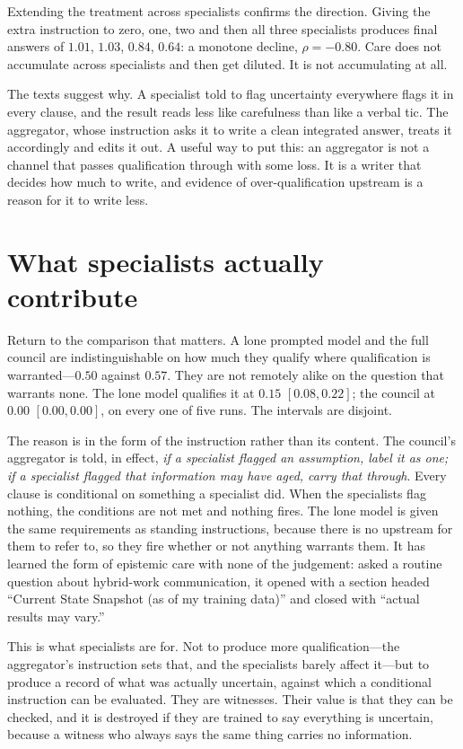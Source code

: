 \documentclass[11pt]{article}
\begin{document}
Extending the treatment across specialists confirms the direction. Giving the
extra instruction to zero, one, two and then all three specialists produces
final answers of $1.01$, $1.03$, $0.84$, $0.64$: a monotone decline,
$\rho = -0.80$. Care does not accumulate across specialists and then get
diluted. It is not accumulating at all.

The texts suggest why. A specialist told to flag uncertainty everywhere flags
it in every clause, and the result reads less like carefulness than like a
verbal tic. The aggregator, whose instruction asks it to write a clean
integrated answer, treats it accordingly and edits it out. A useful way to
put this: an aggregator is not a channel that passes qualification through
with some loss. It is a writer that decides how much to write, and evidence
of over-qualification upstream is a reason for it to write less.

\section{What specialists actually contribute}
Return to the comparison that matters. A lone prompted model and the full
council are indistinguishable on how much they qualify where qualification is
warranted---$0.50$ against $0.57$. They are not remotely alike on the question
that warrants none. The lone model qualifies it at $0.15$ $[0.08,0.22]$; the
council at $0.00$ $[0.00,0.00]$, on every one of five runs. The intervals are
disjoint.

The reason is in the form of the instruction rather than its content. The
council's aggregator is told, in effect, \emph{if a specialist flagged an
assumption, label it as one; if a specialist flagged that information may have
aged, carry that through}. Every clause is conditional on something a
specialist did. When the specialists flag nothing, the conditions are not met
and nothing fires. The lone model is given the same requirements as standing
instructions, because there is no upstream for them to refer to, so they fire
whether or not anything warrants them. It has learned the form of epistemic
care with none of the judgement: asked a routine question about hybrid-work
communication, it opened with a section headed ``Current State Snapshot (as of
my training data)'' and closed with ``actual results may vary.''

This is what specialists are for. Not to produce more qualification---the
aggregator's instruction sets that, and the specialists barely affect it---but
to produce a record of what was actually uncertain, against which a
conditional instruction can be evaluated. They are witnesses. Their value is
that they can be checked, and it is destroyed if they are trained to say
everything is uncertain, because a witness who always says the same thing
carries no information.
\end{document}
